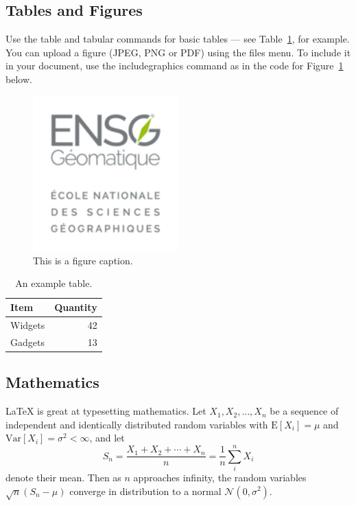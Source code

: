 
\subsection{Tables and Figures}

Use the table and tabular commands for basic tables --- see Table~\ref{tab:widgets}, for example. You can upload a figure (JPEG, PNG or PDF) using the files menu. To include it in your document, use the includegraphics command as in the code for Figure~\ref{fig:frog} below.

\begin{figure}
\centering
\includegraphics[width=0.5\textwidth]{../images/logo.png}
\caption{\label{fig:frog}This is a figure caption.}
\end{figure}

\begin{table}
\centering
\begin{tabular}{l|r}
Item & Quantity \\\hline
Widgets & 42 \\
Gadgets & 13
\end{tabular}
\caption{\label{tab:widgets}An example table.}
\end{table}

\subsection{Mathematics}

\LaTeX{} is great at typesetting mathematics. Let $X_1, X_2, \ldots, X_n$ be a sequence of independent and identically distributed random variables with $\text{E}[X_i] = \mu$ and $\text{Var}[X_i] = \sigma^2 < \infty$, and let
$$S_n = \frac{X_1 + X_2 + \cdots + X_n}{n}
      = \frac{1}{n}\sum_{i}^{n} X_i$$
denote their mean. Then as $n$ approaches infinity, the random variables $\sqrt{n}(S_n - \mu)$ converge in distribution to a normal $\mathcal{N}(0, \sigma^2)$.

